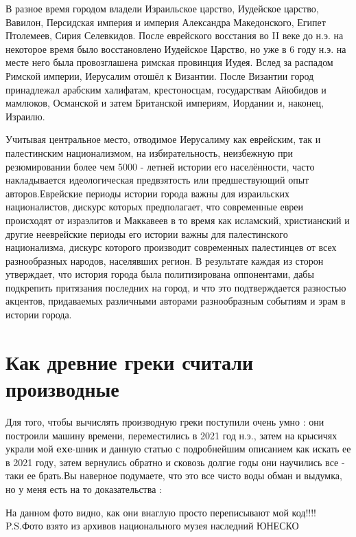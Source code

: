\documentclass[a4paper,12pt]{article}
\begin{document}
В разное время городом владели Израильское царство, Иудейское царство, Вавилон, Персидская империя и империя Александра Македонского, Египет Птолемеев, Сирия Селевкидов. После еврейского восстания во II веке до н.э. на некоторое время было восстановлено Иудейское Царство, но уже в 6 году н.э. на месте него была провозглашена римская провинция Иудея. Вслед за распадом Римской империи, Иерусалим отошёл к Византии. После Византии город принадлежал арабским халифатам, крестоносцам, государствам Айюбидов и мамлюков, Османской и затем Британской империям, Иордании и, наконец, Израилю.

 Учитывая центральное место, отводимое Иерусалиму как еврейским, так и палестинским национализмом, на избирательность, неизбежную при резюмировании более чем 5000 - летней истории его населённости, часто накладывается идеологическая предвзятость или предшествующий опыт авторов.Еврейские периоды истории города важны для израильских националистов, дискурс которых предполагает, что современные евреи происходят от израэлитов и Маккавеев в то время как исламский, христианский и другие нееврейские периоды его истории важны для палестинского национализма, дискурс которого производит современных палестинцев от всех разнообразных народов, населявших регион. В результате каждая из сторон утверждает, что история города была политизирована оппонентами, дабы подкрепить притязания последних на город, и что это подтверждается разностью акцентов, придаваемых различными авторами разнообразным событиям и эрам в истории города.

\section{Как древние греки считали производные}
Для того, чтобы вычислять производную греки поступили очень умно : они построили машину времени, переместились в 2021 год н.э., затем на крысичях украли мой \textbf{exe}-шник и данную статью с подробнейшим описанием как искать ее в 2021 году, затем вернулись обратно и сковозь долгие годы они научились все - таки ее брать.Вы наверное подумаете, что это все чисто воды обман и выдумка, но у меня есть на то доказательства : \newpage

 \begin{figure}[h]
 \label{ photo1:1 }
 \end{figure}

 На данном фото видно, как они внаглую просто переписывают мой код!!!! P.S.Фото взято из архивов национального музея наследний ЮНЕСКО
\end{document}
